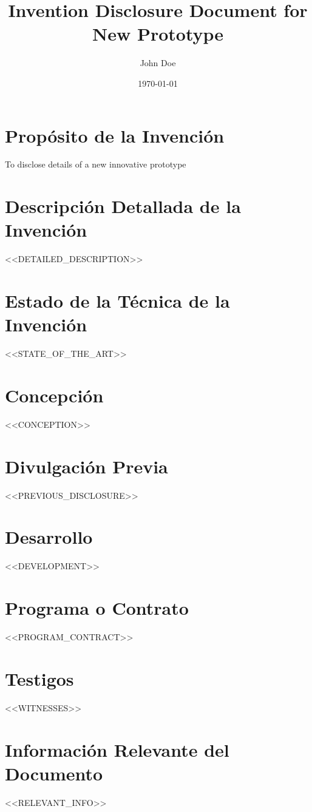 \documentclass{article}
\title{Invention Disclosure Document for New Prototype}
\author{John Doe}
\date{\today}
\begin{document}
\maketitle

\section*{Propósito de la Invención}
To disclose details of a new innovative prototype

\section*{Descripción Detallada de la Invención}
<<DETAILED_DESCRIPTION>>

\section*{Estado de la Técnica de la Invención}
<<STATE_OF_THE_ART>>

\section*{Concepción}
<<CONCEPTION>>

\section*{Divulgación Previa}
<<PREVIOUS_DISCLOSURE>>

\section*{Desarrollo}
<<DEVELOPMENT>>

\section*{Programa o Contrato}
<<PROGRAM_CONTRACT>>

\section*{Testigos}
<<WITNESSES>>

\section*{Información Relevante del Documento}
<<RELEVANT_INFO>>
\end{document}
